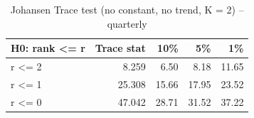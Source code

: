 \begin{table}

\caption{\label{tab:johansen}Johansen Trace test (no constant, no trend, K = 2) -- quarterly}
\centering
\begin{tabular}[t]{lrrrr}
\toprule
H0: rank <= r & Trace stat & 10\% & 5\% & 1\%\\
\midrule
r <= 2 & 8.259 & 6.50 & 8.18 & 11.65\\
r <= 1 & 25.308 & 15.66 & 17.95 & 23.52\\
r <= 0 & 47.042 & 28.71 & 31.52 & 37.22\\
\bottomrule
\end{tabular}
\end{table}
